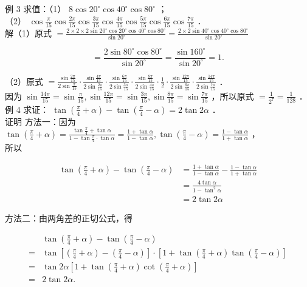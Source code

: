 \documentclass[10pt]{article}
\begin{document}
例 3 求值：（1） \(8 \cos 20^{\circ} \cos 40^{\circ} \cos 80^{\circ}\) ；\\
（2） \(\cos \frac{\pi}{15} \cos \frac{2 \pi}{15} \cos \frac{3 \pi}{15} \cos \frac{4 \pi}{15} \cos \frac{5 \pi}{15} \cos \frac{6 \pi}{15} \cos \frac{7 \pi}{15}\) ．\\
解（1）原式 \(=\frac{2 \times 2 \times 2 \sin 20^{\circ} \cos 20^{\circ} \cos 40^{\circ} \cos 80^{\circ}}{\sin 20^{\circ}}=\frac{2 \times 2 \sin 40^{\circ} \cos 40^{\circ} \cos 80^{\circ}}{\sin 20^{\circ}}\)

\[
=\frac{2 \sin 80^{\circ} \cos 80^{\circ}}{\sin 20^{\circ}}=\frac{\sin 160^{\circ}}{\sin 20^{\circ}}=1 .
\]

（2）原式 \(=\frac{\sin \frac{2 \pi}{15}}{2 \sin \frac{\pi}{15}} \cdot \frac{\sin \frac{4 \pi}{15}}{2 \sin \frac{2 \pi}{15}} \cdot \frac{\sin \frac{6 \pi}{15}}{2 \sin \frac{3 \pi}{15}} \cdot \frac{\sin \frac{8 \pi}{15}}{2 \sin \frac{4 \pi}{15}} \cdot \frac{1}{2} \cdot \frac{\sin \frac{12 \pi}{15}}{2 \sin \frac{6 \pi}{15}} \cdot \frac{\sin \frac{14 \pi}{15}}{2 \sin \frac{7 \pi}{15}}\) ．\\
因为 \(\sin \frac{14 \pi}{15}=\sin \frac{\pi}{15}, \sin \frac{12 \pi}{15}=\sin \frac{3 \pi}{15}, \sin \frac{8 \pi}{15}=\sin \frac{7 \pi}{15}\) ，所以原式 \(=\frac{1}{2^{7}}=\frac{1}{128}\) ．\\
例 4 求证： \(\tan \left(\frac{\pi}{4}+\alpha\right)-\tan \left(\frac{\pi}{4}-\alpha\right)=2 \tan 2 \alpha\) ．\\
证明 方法一：因为 \(\tan \left(\frac{\pi}{4}+\alpha\right)=\frac{\tan \frac{\pi}{4}+\tan \alpha}{1-\tan \frac{\pi}{4} \cdot \tan \alpha}=\frac{1+\tan \alpha}{1-\tan \alpha}, \tan \left(\frac{\pi}{4}-\alpha\right)=\frac{1-\tan \alpha}{1+\tan \alpha}\) ，\\
所以

\[
\begin{aligned}
\tan \left(\frac{\pi}{4}+\alpha\right)-\tan \left(\frac{\pi}{4}-\alpha\right) & =\frac{1+\tan \alpha}{1-\tan \alpha}-\frac{1-\tan \alpha}{1+\tan \alpha} \\
& =\frac{4 \tan \alpha}{1-\tan ^{2} \alpha} \\
& =2 \tan 2 \alpha
\end{aligned}
\]

方法二：由两角差的正切公式，得

\[
\begin{aligned}
& \tan \left(\frac{\pi}{4}+\alpha\right)-\tan \left(\frac{\pi}{4}-\alpha\right) \\
= & \tan \left[\left(\frac{\pi}{4}+\alpha\right)-\left(\frac{\pi}{4}-\alpha\right)\right] \cdot\left[1+\tan \left(\frac{\pi}{4}+\alpha\right) \tan \left(\frac{\pi}{4}-\alpha\right)\right] \\
= & \tan 2 \alpha\left[1+\tan \left(\frac{\pi}{4}+\alpha\right) \cot \left(\frac{\pi}{4}+\alpha\right)\right] \\
= & 2 \tan 2 \alpha .
\end{aligned}
\]
\end{document}
